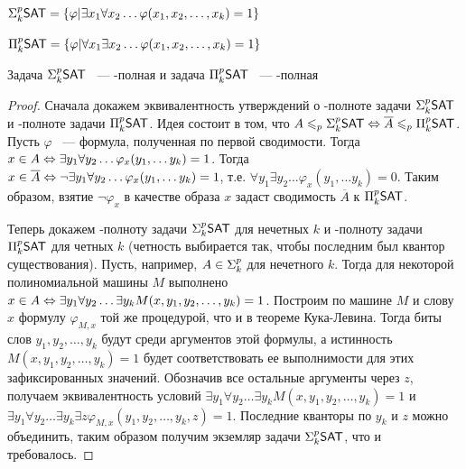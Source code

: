 \begin{definition}
$\textbf{$\Sigma_{k}^p$}\mathsf{SAT} = \{\varphi | \exists x_1 \forall x_2 \ldots \varphi(x_1, x_2, \ldots, x_k) = 1\}$
\end{definition}

\begin{definition}
$\textbf{$\Pi_{k}^p$}\mathsf{SAT} = \{\varphi | \forall x_1 \exists x_2 \ldots \varphi(x_1, x_2, \ldots, x_k) = 1\}$
\end{definition}

\begin{theorem} Задача $\textbf{$\Sigma_{k}^p$}\mathsf{SAT}$ ~--- -полная и задача  $\textbf{$\Pi_{k}^p$}\mathsf{SAT}$ ~--- -полная
\end{theorem}

\begin{proof}

Сначала докажем эквивалентность утверждений о -полноте задачи $\textbf{$\Sigma_{k}^p$}\mathsf{SAT}$ и -полноте задачи $\textbf{$\Pi_{k}^p$}\mathsf{SAT}$. Идея состоит в том, что $A \leqslant_p \textbf{$\Sigma_{k}^p$}\mathsf{SAT} \Leftrightarrow \overline{A} \leqslant_p \textbf{$\Pi_{k}^p$}\mathsf{SAT}$.
Пусть $\varphi$ ~--- формула, полученная по первой сводимости. Тогда $x \in A \Leftrightarrow \exists y_1 \forall y_2 \ldots \varphi_x(y_1, \ldots y_k) = 1$. Тогда $x \in \overline{A} \Leftrightarrow \neg \exists y_1 \forall y_2 \ldots \varphi_x(y_1, \ldots y_k) = 1$, т.е. $\forall y_1 \exists y_2 \ldots \varphi_x(y_1, \ldots y_k) = 0$. Таким образом, взятие $\neg \varphi_x$ в качестве образа $x$ задаст сводимость $\overline{A}$ к $\textbf{$\Pi_{k}^p$}\mathsf{SAT}$.

Теперь докажем -полноту задачи $\textbf{$\Sigma_{k}^p$}\mathsf{SAT}$ для нечетных $k$ и -полноту задачи $\textbf{$\Pi_{k}^p$}\mathsf{SAT}$ для четных $k$ (четность выбирается так, чтобы последним был квантор существования). Пусть, например,  $A \in \textbf{$\Sigma_{k}^p$}$ для нечетного $k$. Тогда для некоторой полиномиальной машины $M$ выполнено $x \in A \Leftrightarrow \exists y_1 \forall y_2 \ldots \exists y_k M(x,y_1,y_2, \ldots, y_k) = 1$. Построим по машине $M$ и слову $x$ формулу $\varphi_{M,x}$ той же процедурой, что и в теореме Кука-Левина. Тогда биты слов $y_1,y_2, \ldots, y_k$ будут среди аргументов этой формулы, а истинность $M(x,y_1,y_2, \ldots, y_k) = 1$ будет соответствовать ее выполнимости для этих зафиксированных значений. Обозначив все остальные аргументы через $z$, получаем эквивалентность условий $\exists y_1 \forall y_2 \ldots \exists y_k M(x,y_1,y_2, \ldots, y_k) = 1$ и $\exists y_1 \forall y_2 \ldots \exists y_k \exists z \varphi_{M,x}(y_1,y_2, \ldots, y_k, z) = 1$. Последние кванторы по $y_k$ и $z$ можно объединить, таким образом получим экземляр задачи $\textbf{$\Sigma_{k}^p$}\mathsf{SAT}$, что и требовалось.
\end{proof}
